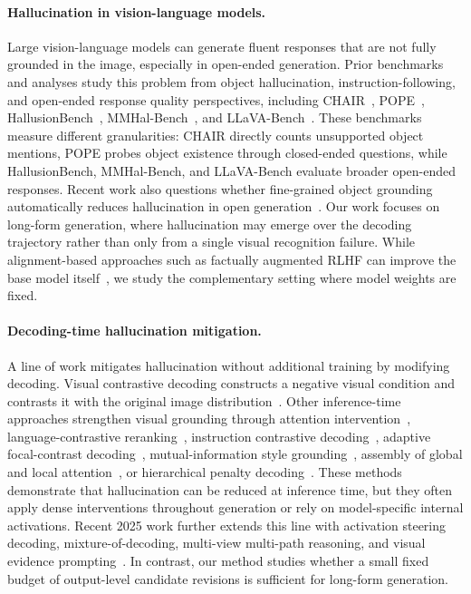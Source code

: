 \documentclass[11pt]{article}
\begin{document}
  \paragraph{Hallucination in vision-language models.}
  Large vision-language models can generate fluent responses that are not fully grounded in the image, especially in open-ended generation.
  Prior benchmarks and analyses study this problem from object hallucination, instruction-following, and open-ended response quality perspectives, including CHAIR~\citep{rohrbach-etal-2018-object}, POPE~\citep{li-etal-2023-evaluating},
  HallusionBench~\citep{guan2023hallusionbench}, MMHal-Bench~\citep{sun-etal-2024-aligning}, and LLaVA-Bench~\citep{liu-etal-2023-visual-instruction}.
  These benchmarks measure different granularities: CHAIR directly counts unsupported object mentions, POPE probes object existence through closed-ended questions, while HallusionBench, MMHal-Bench, and LLaVA-Bench evaluate broader open-ended responses.
  Recent work also questions whether fine-grained object grounding automatically reduces hallucination in open generation~\citep{geigle2024objectgrounding}.
  Our work focuses on long-form generation, where hallucination may emerge over the decoding trajectory rather than only from a single visual recognition failure.
  While alignment-based approaches such as factually augmented RLHF can improve the base model itself~\citep{sun-etal-2024-aligning}, we study the complementary setting where model weights are fixed.

  \paragraph{Decoding-time hallucination mitigation.}
  A line of work mitigates hallucination without additional training by modifying decoding.
  Visual contrastive decoding constructs a negative visual condition and contrasts it with the original image distribution~\citep{Leng_2024_CVPR}.
  Other inference-time approaches strengthen visual grounding through attention intervention~\citep{liu2024payingattentionimagetrainingfree}, language-contrastive reranking~\citep{manevich-tsarfaty-2024-lcd}, instruction contrastive decoding~\citep{wang-etal-2024-mitigating}, adaptive focal-contrast decoding~\citep{chen2024halc}, mutual-information style grounding~\citep{favero2024m3id}, assembly of global and local attention~\citep{an2024agla}, or hierarchical penalty decoding~\citep{yuan-etal-2024-helpd}.
  These methods demonstrate that hallucination can be reduced at inference time, but they often apply dense interventions throughout generation or rely on model-specific internal activations.
  Recent 2025 work further extends this line with activation steering decoding, mixture-of-decoding, multi-view multi-path reasoning, and visual evidence prompting~\citep{su-etal-2025-activation,chen-etal-2025-mixture-decoding,qu-etal-2025-look,li-etal-2025-visual}.
  In contrast, our method studies whether a small fixed budget of output-level candidate revisions is sufficient for long-form generation.
\end{document}
